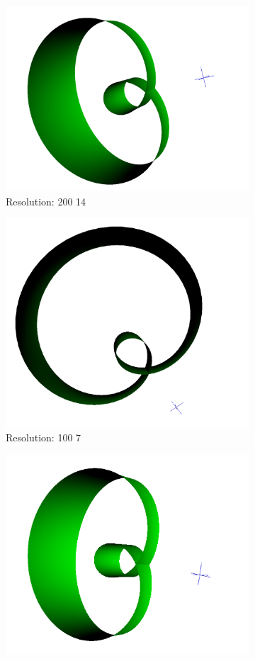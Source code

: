 \documentclass[acmlarge,nonacm=true]{acmart}
\begin{document}
\begin{figure}[H]
	\begin{subfigure}{.33\textwidth}
	  \centering
	  \includegraphics[width=.8\linewidth]{fig/3_200_14}
	  \caption{Resolution: 200 14}
	\end{subfigure}%
	\begin{subfigure}{.33\textwidth}
	  \centering
	  \includegraphics[width=.8\linewidth]{fig/3_100_7}
	  \caption{Resolution: 100 7}
	\end{subfigure}
	\begin{subfigure}{.33\textwidth}
		\centering
		\includegraphics[width=.8\linewidth]{fig/3_400_28}

\end{subfigure}
\end{figure}
\end{document}
